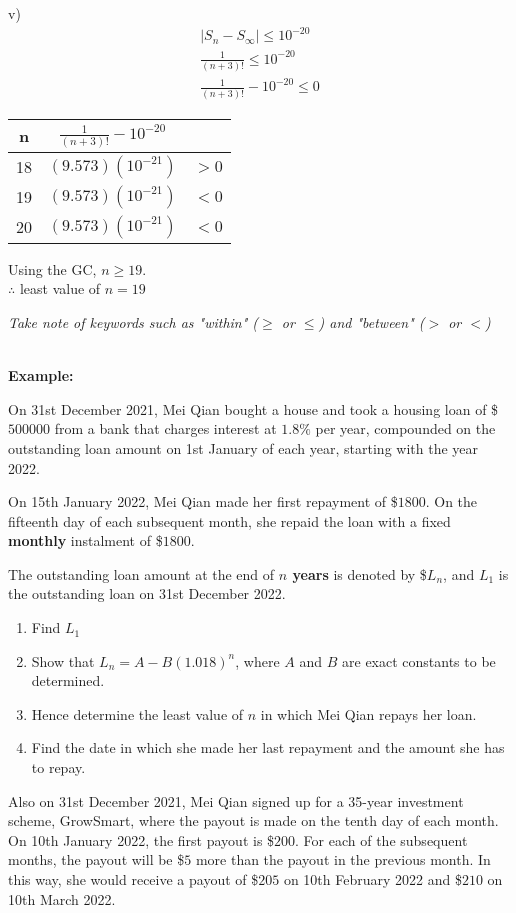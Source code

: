 \documentclass[12pt, a4paper, titlepage]{article}
\begin{document}
v)
\begin{align*}
    |S_n - S_\infty| \leq 10^{-20} \\
    \frac{1}{(n + 3)!} \leq 10^{-20} \\
    \frac{1}{(n + 3)!} - 10^{-20} \leq 0
\end{align*}

\begin{minipage}{0.4\textwidth}
    \begin{tabular}{c|c|c}
        n & $\frac{1}{(n + 3)!} - 10^{-20}$ \\
        \hline
        18 & $(9.573)(10^{-21})$ & $> 0$ \\
        \hline
        19 & $(9.573)(10^{-21})$ & $< 0$ \\
        \hline
        20 & $(9.573)(10^{-21})$ & $< 0$
    \end{tabular}
\end{minipage}
\begin{minipage}{0.6\textwidth}
    Using the GC, $n \ge 19$. \\
    $\therefore$ least value of $n = 19$
\end{minipage}

\emph{Take note of keywords such as "within" ($\ge$ or $\le$) and "between" ($>$ or $<$)}

\textbf{\\ Example:}

On 31st December 2021, Mei Qian bought a house and took a housing loan of \$$500000$ from a bank that charges interest at $1.8\%$ per year, compounded on the outstanding loan amount on 1st January of each year, starting with the year 2022.

On 15th January 2022, Mei Qian made her first repayment of \$$1800$. On the fifteenth day of each subsequent month, she repaid the loan with a fixed \textbf{monthly} instalment of \$$1800$.

The outstanding loan amount at the end of \textbf{$n$ years} is denoted by \$$L_n$, and $L_1$ is the outstanding loan on 31st December 2022.

\begin{enumerate}[label=(\roman*)]
    \item Find $L_1$
    \item Show that $L_n = A - B(1.018)^n$, where $A$ and $B$ are exact constants to be determined.
    \item Hence determine the least value of $n$ in which Mei Qian repays her loan.
    \item Find the date in which she made her last repayment and the amount she has to repay.
\end{enumerate}
Also on 31st December 2021, Mei Qian signed up for a 35-year investment scheme, GrowSmart, where the payout is made on the tenth day of each month. On 10th January 2022, the first payout is \$$200$. For each of the subsequent months, the payout will be \$$5$ more than the payout in the previous month. In this way, she would receive a payout of \$$205$ on 10th February 2022 and \$$210$ on 10th March 2022.
\end{document}

